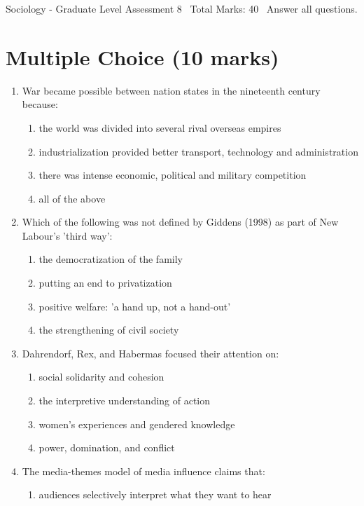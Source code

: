\documentclass[12pt]{article}
\begin{document}
\begin{center}
Sociology - Graduate Level Assessment 8 \
Total Marks: 40 \
Answer all questions.
\end{center}

\section*{Multiple Choice (10 marks)}
\begin{enumerate}[label=\arabic*.]
\item War became possible between nation states in the nineteenth century because:
\begin{enumerate}[label=(\alph*)]
    \item the world was divided into several rival overseas empires
    \item industrialization provided better transport, technology and administration
    \item there was intense economic, political and military competition
    \item all of the above
\end{enumerate}
\item Which of the following was not defined by Giddens (1998) as part of New Labour's 'third way':
\begin{enumerate}[label=(\alph*)]
    \item the democratization of the family
    \item putting an end to privatization
    \item positive welfare: 'a hand up, not a hand-out'
    \item the strengthening of civil society
\end{enumerate}
\item Dahrendorf, Rex, and Habermas focused their attention on:
\begin{enumerate}[label=(\alph*)]
    \item social solidarity and cohesion
    \item the interpretive understanding of action
    \item women's experiences and gendered knowledge
    \item power, domination, and conflict
\end{enumerate}
\item The media-themes model of media influence claims that:
\begin{enumerate}[label=(\alph*)]
    \item audiences selectively interpret what they want to hear

\end{enumerate}
\end{enumerate}
\end{document}
